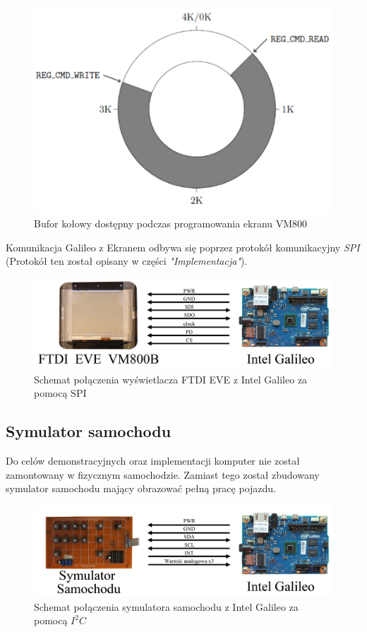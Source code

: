 \documentclass{xmgr}
\begin{document}
\begin{figure}[!h]
    \centering
    \includegraphics[height=0.25\textheight]{images/buf.png}
    \caption{Bufor kołowy dostępny podczas programowania ekranu VM800}
\end{figure}

Komunikacja Galileo z Ekranem odbywa się poprzez protokół komunikacyjny \emph{SPI} (Protokół ten został opisany w części \emph{"Implementacja"}).

\begin{figure}[!h]
    \centering
    \includegraphics[height=0.24\textheight]{images/ekranGalileo.jpg}
    \caption{Schemat połączenia wyświetlacza FTDI EVE z Intel Galileo za pomocą SPI}
\end{figure}

\subsection{Symulator samochodu}
Do celów demonstracyjnych oraz implementacji komputer nie został zamontowany w fizycznym samochodzie. Zamiast tego został zbudowany symulator samochodu mający obrazować pełną pracę pojazdu.

\begin{figure}[!h]
    \centering
    \includegraphics[height=0.24\textheight]{images/symulatorGalileo.jpg}
    \caption{Schemat połączenia symulatora samochodu z Intel Galileo za pomocą $I^2C$}
\end{figure}
\end{document}
